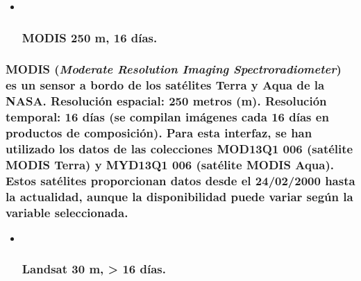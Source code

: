 \documentclass[
]{book}
\begin{document}
\begin{itemize}
\item ~
  \subsubsection{\texorpdfstring{\textbf{MODIS 250 m, 16 días.}}{MODIS 250 m, 16 días.}}\label{modis-250-m-16-duxedas.}
\end{itemize}

\subsubsection{\texorpdfstring{MODIS (\emph{Moderate Resolution Imaging Spectroradiometer}) es un sensor a bordo de los satélites Terra y Aqua de la NASA. \textbf{Resolución espacial:} 250 metros (m). \textbf{Resolución temporal:} 16 días (se compilan imágenes cada 16 días en productos de composición). Para esta interfaz, se han utilizado los datos de las colecciones \textbf{MOD13Q1 006} (satélite MODIS Terra) y \textbf{MYD13Q1 006} (satélite MODIS Aqua). Estos satélites \textbf{proporcionan datos desde} el \textbf{24/02/2000 hasta la actualidad}, aunque la disponibilidad puede variar según la variable seleccionada.}{MODIS (Moderate Resolution Imaging Spectroradiometer) es un sensor a bordo de los satélites Terra y Aqua de la NASA. Resolución espacial: 250 metros (m). Resolución temporal: 16 días (se compilan imágenes cada 16 días en productos de composición). Para esta interfaz, se han utilizado los datos de las colecciones MOD13Q1 006 (satélite MODIS Terra) y MYD13Q1 006 (satélite MODIS Aqua). Estos satélites proporcionan datos desde el 24/02/2000 hasta la actualidad, aunque la disponibilidad puede variar según la variable seleccionada.}}\label{modis-moderate-resolution-imaging-spectroradiometer-es-un-sensor-a-bordo-de-los-satuxe9lites-terra-y-aqua-de-la-nasa.-resoluciuxf3n-espacial-250-metros-m.-resoluciuxf3n-temporal-16-duxedas-se-compilan-imuxe1genes-cada-16-duxedas-en-productos-de-composiciuxf3n.-para-esta-interfaz-se-han-utilizado-los-datos-de-las-colecciones-mod13q1-006-satuxe9lite-modis-terra-y-myd13q1-006-satuxe9lite-modis-aqua.-estos-satuxe9lites-proporcionan-datos-desde-el-24022000-hasta-la-actualidad-aunque-la-disponibilidad-puede-variar-seguxfan-la-variable-seleccionada.}

\begin{itemize}
\item ~
  \subsubsection{\texorpdfstring{\textbf{Landsat 30 m, \textgreater{} 16 días.}}{Landsat 30 m, \textgreater{} 16 días.}}\label{landsat-30-m-16-duxedas.}
\end{itemize}
\end{document}
